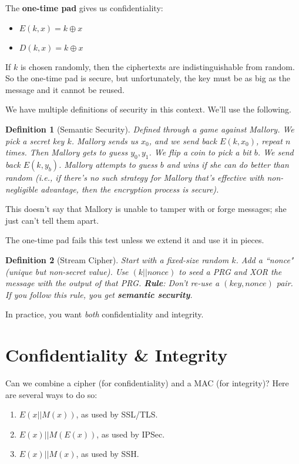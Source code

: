 \documentclass[12pt]{article}
\newtheorem*{mydef}{Definition}
\begin{document}
The \textbf{one-time pad} gives us confidentiality:
\begin{itemize}
\item $E(k, x) = k \oplus x$
\item $D(k, x) = k \oplus x$
\end{itemize}

If $k$ is chosen randomly, then the ciphertexts are indistinguishable from random. So the one-time pad is secure, but unfortunately, the key must be as big as the message and it cannot be reused.

We have multiple definitions of security in this context. We'll use the following.

\begin{mydef}[Semantic Security]
Defined through a game against Mallory. We pick a secret key $k$. Mallory sends us $x_0$, and we send back $E(k, x_0)$, repeat $n$ times. Then Mallory gets to guess $y_0, y_1$. We flip a coin to pick a bit $b$. We send back $E(k, y_b)$. Mallory attempts to guess $b$ and wins if she can do better than random (i.e., if there's no such strategy for Mallory that's effective with non-negligible advantage, then the encryption process is secure).
\end{mydef}

This doesn't say that Mallory is unable to tamper with or forge messages; she just can't tell them apart.

The one-time pad fails this test unless we extend it and use it in pieces.

\begin{mydef}[Stream Cipher]
Start with a fixed-size random $k$. Add a ``nonce" (unique but non-secret value). Use $(k || nonce)$ to seed a PRG and XOR the message with the output of that PRG. \textbf{Rule}: Don't re-use a $(key, nonce)$ pair. If you follow this rule, you get \textbf{semantic security}.
\end{mydef}

In practice, you want \textit{both} confidentiality and integrity.

\section*{Confidentiality \& Integrity}

Can we combine a cipher (for confidentiality) and a MAC (for integrity)? Here are several ways to do so:
\begin{enumerate}
\item $E(x || M(x))$, as used by SSL/TLS.
\item $E(x) || M(E(x))$, as used by IPSec.
\item $E(x) || M(x)$, as used by SSH.
\end{enumerate}
\end{document}

